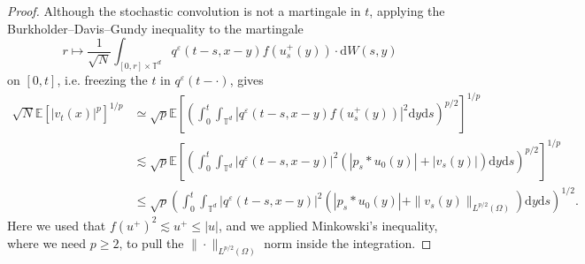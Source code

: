 \documentclass[a4paper,12pt]{article}
\newcommand{\mathd}{\mathrm{d}}
\begin{document}
\begin{proof}
  Although the stochastic  convolution is  not a martingale in $t$, 
  applying the Burkholder--Davis--Gundy inequality  to
  the martingale 
  $$ r \mapsto\frac{1}{\sqrt{N}} \int_{[0, r] \times \mathbb{T}^d}
  q^{\varepsilon} (t - s, x - y) f (u_s^+(y)) \cdot \mathd W (s, y)
  $$
  on $[0,t]$, i.e. freezing the $t$ in $q^{\varepsilon} (t - \cdot)$, gives
  \begin{align*}
    \sqrt{N} \mathbb{E} [| v_t (x) |^p]^{1 / p} & \simeq \sqrt{p} \mathbb{E}
    \left[ \left( \int_0^t \int_{\mathbb{T}^d} | q^{\varepsilon} (t - s, x -
    y) f (u_s^+(y)) |^2 \mathd y \mathd s \right)^{p / 2} \right]^{1 / p}\\
    & \lesssim \sqrt{p} \mathbb{E} \left[ \left( \int_0^t
    \int_{\mathbb{T}^d} | q^{\varepsilon} (t - s, x - y) |^2 (| p_s \ast u_0
    (y) | + | v_s (y) |) \mathd y \mathd s \right)^{p / 2} \right]^{1 / p}\\
    & \leq \sqrt{p} \left( \int_0^t \int_{\mathbb{T}^d} |
    q^{\varepsilon} (t - s, x - y) |^2 (| p_s \ast u_0 (y) | + \| v_s (y)
    \|_{L^{p / 2} (\Omega)}) \mathd y \mathd s \right)^{1 / 2}.
  \end{align*}
  Here we used that $f (u^+)^2 \lesssim u^+ \leq | u |$, and we applied
  Minkowski's inequality, where we need $p \geq 2$, to pull the $\|
  \cdot \|_{L^{p / 2} (\Omega)}$ norm inside the integration. 
  

\end{proof}
\end{document}
